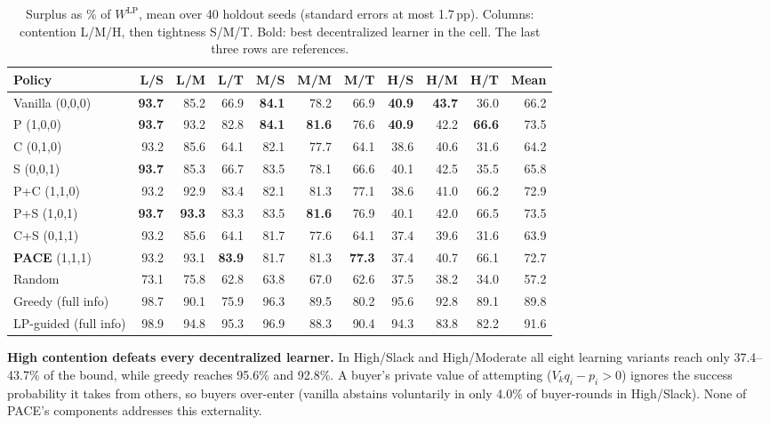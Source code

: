 \documentclass{article}
\newcommand{\WLP}{W^{\mathrm{LP}}}
\begin{document}
\begin{table}[h]
\centering\small
\caption{Surplus as \% of $\WLP$, mean over 40 holdout seeds (standard errors at most 1.7\,pp). Columns: contention L/M/H, then tightness S/M/T. Bold: best decentralized learner in the cell. The last three rows are references.}
\label{tab:bench}
\begin{tabular}{@{}l*{9}{r}r@{}}
\toprule
\textbf{Policy} & L/S & L/M & L/T & M/S & M/M & M/T & H/S & H/M & H/T & Mean \\
\midrule
Vanilla (0,0,0) & \textbf{93.7} & 85.2 & 66.9 & \textbf{84.1} & 78.2 & 66.9 & \textbf{40.9} & \textbf{43.7} & 36.0 & 66.2 \\
P (1,0,0) & \textbf{93.7} & 93.2 & 82.8 & \textbf{84.1} & \textbf{81.6} & 76.6 & \textbf{40.9} & 42.2 & \textbf{66.6} & 73.5 \\
C (0,1,0) & 93.2 & 85.6 & 64.1 & 82.1 & 77.7 & 64.1 & 38.6 & 40.6 & 31.6 & 64.2 \\
S (0,0,1) & \textbf{93.7} & 85.3 & 66.7 & 83.5 & 78.1 & 66.6 & 40.1 & 42.5 & 35.5 & 65.8 \\
P+C (1,1,0) & 93.2 & 92.9 & 83.4 & 82.1 & 81.3 & 77.1 & 38.6 & 41.0 & 66.2 & 72.9 \\
P+S (1,0,1) & \textbf{93.7} & \textbf{93.3} & 83.3 & 83.5 & \textbf{81.6} & 76.9 & 40.1 & 42.0 & 66.5 & 73.5 \\
C+S (0,1,1) & 93.2 & 85.6 & 64.1 & 81.7 & 77.6 & 64.1 & 37.4 & 39.6 & 31.6 & 63.9 \\
\textbf{PACE} (1,1,1) & 93.2 & 93.1 & \textbf{83.9} & 81.7 & 81.3 & \textbf{77.3} & 37.4 & 40.7 & 66.1 & 72.7 \\
\midrule
Random & 73.1 & 75.8 & 62.8 & 63.8 & 67.0 & 62.6 & 37.5 & 38.2 & 34.0 & 57.2 \\
Greedy (full info) & 98.7 & 90.1 & 75.9 & 96.3 & 89.5 & 80.2 & 95.6 & 92.8 & 89.1 & 89.8 \\
LP-guided (full info) & 98.9 & 94.8 & 95.3 & 96.9 & 88.3 & 90.4 & 94.3 & 83.8 & 82.2 & 91.6 \\
\bottomrule
\end{tabular}
\end{table}

\textbf{High contention defeats every decentralized learner.} In High/Slack and High/Moderate all eight learning variants reach only 37.4--43.7\% of the bound, while greedy reaches 95.6\% and 92.8\%. A buyer's private value of attempting ($V_kq_i-p_i>0$) ignores the success probability it takes from others, so buyers over-enter (vanilla abstains voluntarily in only 4.0\% of buyer-rounds in High/Slack). None of PACE's components addresses this externality.
\end{document}
